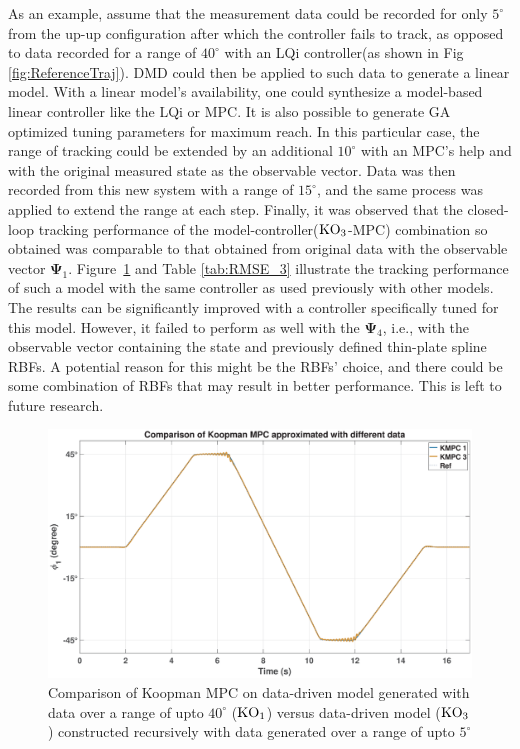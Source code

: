 As an example, assume that the measurement data could be recorded for only $5^\circ$ from the up-up configuration after which the controller fails to track, as opposed to data recorded for a range of $40^\circ$ with an LQi controller(as shown in Fig \ref{fig:ReferenceTraj}). DMD could then be applied to such data to generate a linear model. With a linear model's availability, one could synthesize a model-based linear controller like the LQi or MPC. It is also possible to generate GA optimized tuning parameters for maximum reach. In this particular case, the range of tracking could be extended by an additional $10^\circ$ with an MPC's help and with the original measured state as the observable vector. Data was then recorded from this new system with a range of $15^\circ$, and the same process was applied to extend the range at each step. Finally, it was observed that the closed-loop tracking performance of the model-controller($\textup{KO}_3$-MPC) combination so obtained was comparable to that obtained from original data with the observable vector $\mathbf{\Psi}_1$. Figure~\ref{fig:diffdata} and Table \ref{tab:RMSE_3} illustrate the tracking performance of such a model with the same controller as used previously with other models. The results can be significantly improved with a controller specifically tuned for this model. However, it failed to perform as well with the $\mathbf{\Psi}_4$, i.e., with the observable vector containing the state and previously defined thin-plate spline RBFs. A potential reason for this might be the RBFs' choice, and there could be some combination of RBFs that may result in better performance. This is left to future research.
% 
\begin{figure}[H]
    \centering
    \includegraphics[width=1\linewidth]{figures/KMPC_diffdata}
    \caption{Comparison of Koopman MPC on data-driven model generated with data over a range of upto $40^\circ$ ($\textup{KO}_1$) versus data-driven model ($\textup{KO}_3$) constructed recursively with data generated over a range of upto $5^\circ$}
    \label{fig:diffdata}
\end{figure}

